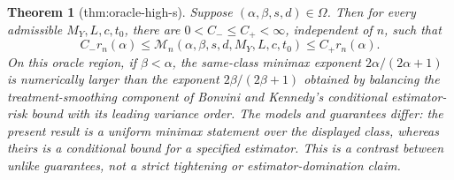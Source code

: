 \documentclass{article}
\newtheorem{theorem}{Theorem}
\begin{document}
\begin{theorem}[thm:oracle-high-s]\label{thm:oracle-high-s}
Suppose \((\alpha,\beta,s,d)\in\Omega\). Then for every admissible \(M_Y,L,c,t_0\), there are \(0<C_-\le C_+<\infty\), independent of \(n\), such that \[C_-r_n(\alpha)\le\mathcal M_n(\alpha,\beta,s,d,M_Y,L,c,t_0)\le C_+r_n(\alpha).\] On this oracle region, if \(\beta<\alpha\), the same-class minimax exponent \(2\alpha/(2\alpha+1)\) is numerically larger than the exponent \(2\beta/(2\beta+1)\) obtained by balancing the treatment-smoothing component of Bonvini and Kennedy's conditional estimator-risk bound with its leading variance order. The models and guarantees differ: the present result is a uniform minimax statement over the displayed class, whereas theirs is a conditional bound for a specified estimator. This is a contrast between unlike guarantees, not a strict tightening or estimator-domination claim.
\end{theorem}
\end{document}
